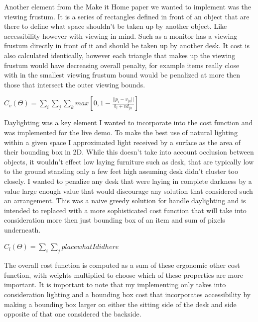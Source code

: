 \documentclass[twoside]{article}
\begin{document}
\begin{multicols}{2}
Another element from the Make it Home paper we wanted to implement was the viewing frustum. It is a series of rectangles
defined in front of an object that are there to define what space shouldn't be taken up by another object. Like accessibility
however with viewing in mind. Such as a monitor has a viewing frustum directly in front of it and should be taken up by another
desk. It cost is also calculated identically, however each triangle that makes up the viewing frustum would have decreasing 
overall penalty, for example items really close with in the smallest viewing frustum bound would be penalized at more then those
that intersect the outer viewing bounds.
\begin{center}
$C_v (\Theta) = \sum_{i}\sum_{j}\sum_{k} max\left[ 0,1 - \frac{||p_i - v_{jk}||}{b_i + vd_{jk}} \right]$
\end{center}

Daylighting was a key element I wanted to incorporate into the cost function and was implemented for the live demo.
To make the best use of natural lighting within a given space I approximated light received by a surface as the area of
their bounding box in 2D. While this doesn't take into account occlusion between objects, it wouldn't effect low laying furniture
such as desk, that are typically low to the ground standing only a few feet high assuming desk didn't cluster too closely.
I wanted to penalize any desk that were laying in complete darkness by a value large enough value that would discourage any
solution that considered such an arrangement. This was a naive greedy solution for handle daylighting and is intended to replaced
with a more sophisticated cost function that will take into consideration more then just bounding box of an item and sum
of pixels underneath.
\begin{center}
$C_l (\Theta) = \sum_{i}\sum_{j} place what I did here$ %
\end{center}

The overall cost function is computed as a sum of these ergonomic other cost function, with weights multiplied to choose which
of these properties are more important. It is important to note that my implementing only takes into consideration lighting
and a bounding box cost that incorporates accessibility by making a bounding box larger on either the sitting side of the desk
and side opposite of that one considered the backside. 


\end{multicols}
\end{document}
